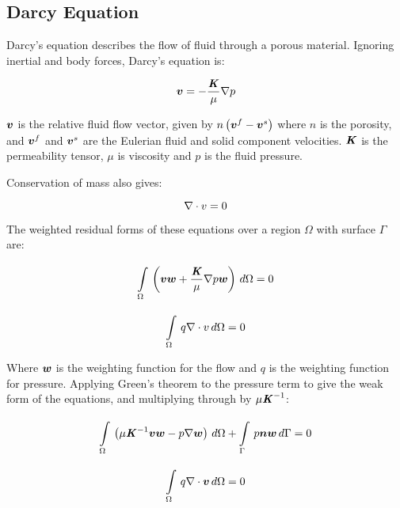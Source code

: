 \subsection{Darcy Equation}

Darcy's equation describes the flow of fluid through a porous material. Ignoring inertial
and body forces, Darcy's equation is:

\begin{equation}
  \vectr{v} = -\frac{\tensor{K}}{\mu} \gradient{}{p}
\end{equation}

$\boldsymbol{v}$ is the relative fluid flow vector, given by
$n \left( \boldsymbol{v}^f - \boldsymbol{v}^s \right)$ where $n$ is the porosity, and
$\boldsymbol{v}^f$ and $\boldsymbol{v}^s$ are the Eulerian fluid and solid component
velocities.  $\boldsymbol{\mathit{K}}$ is the permeability tensor, $\mu$ is viscosity and
$p$ is the fluid pressure.

Conservation of mass also gives:

\begin{equation}
  \divergence{}{v} = 0
\end{equation}

The weighted residual forms of these equations over a region $\Omega$ with surface $\Gamma$ are:

\begin{equation}
  \gint{\Omega}{}{\pbrac{\vectr{v} \vectr{w} + \frac{\tensor{K}}{\mu}\gradient{}{p}\vectr{w}}}{\Omega} = 0
\end{equation}

\begin{equation}
  \gint{\Omega}{}{q \divergence{}{v}}{\Omega} = 0
\end{equation}

Where $\boldsymbol{w}$ is the weighting function for the flow and $q$ is the weighting function
for pressure.
Applying Green's theorem to the pressure term to give the weak form of the equations, and multiplying through by
$\mu {\ensuremath{\boldsymbol{\mathit{K}}}}^{-1}$:

\begin{equation}
  \gint{\Omega}{}{\pbrac{\mu \inverse{\tensor{K}} \vectr{v} \vectr{w} - p \gradient{}{\vectr{w}}}}{\Omega}  + %
  \gint{\Gamma}{}{p \vectr{n} \vectr{w}}{\Gamma}= 0
\end{equation}

\begin{equation}
  \gint{\Omega}{}{q \divergence{}{\vectr{v}}}{\Omega}= 0
\end{equation}

